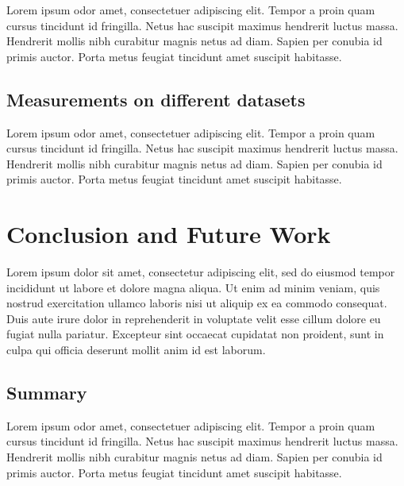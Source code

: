\documentclass[10pt,twocolumn,letterpaper]{article}
\begin{document}
Lorem ipsum odor amet, consectetuer adipiscing elit. Tempor a proin quam cursus
tincidunt id fringilla. Netus hac suscipit maximus hendrerit luctus massa.
Hendrerit mollis nibh curabitur magnis netus ad diam. Sapien per conubia id
primis auctor. Porta metus feugiat tincidunt amet suscipit habitasse.


\subsection{Measurements on different datasets}

Lorem ipsum odor amet, consectetuer adipiscing elit. Tempor a proin quam cursus
tincidunt id fringilla. Netus hac suscipit maximus hendrerit luctus massa.
Hendrerit mollis nibh curabitur magnis netus ad diam. Sapien per conubia id
primis auctor. Porta metus feugiat tincidunt amet suscipit habitasse.


\section{Conclusion and Future Work}\label{sec:conclusion-and-future-work}

Lorem ipsum dolor sit amet, consectetur adipiscing elit, sed do eiusmod tempor
incididunt ut labore et dolore magna aliqua. Ut enim ad minim veniam, quis
nostrud exercitation ullamco laboris nisi ut aliquip ex ea commodo consequat.
Duis aute irure dolor in reprehenderit in voluptate velit esse cillum dolore eu
fugiat nulla pariatur. Excepteur sint occaecat cupidatat non proident, sunt in
culpa qui officia deserunt mollit anim id est laborum.


\subsection{Summary}

Lorem ipsum odor amet, consectetuer adipiscing elit. Tempor a proin quam cursus
tincidunt id fringilla. Netus hac suscipit maximus hendrerit luctus massa.
Hendrerit mollis nibh curabitur magnis netus ad diam. Sapien per conubia id
primis auctor. Porta metus feugiat tincidunt amet suscipit habitasse.


    {\small
        
        
    }
\end{document}
